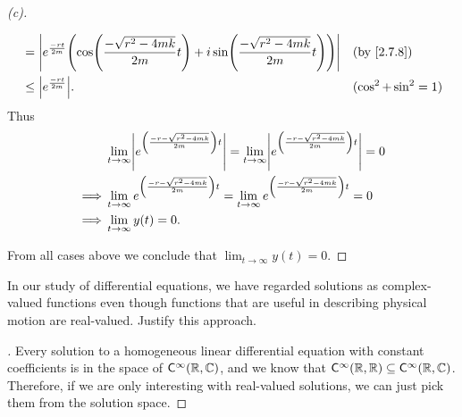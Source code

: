 \begin{proof}[(c)]
\begin{itemize}
\begin{align*}
			       & = \abs{e^{\frac{-rt}{2m}} \pa{\cos\pa{\frac{-\sqrt{r^2 - 4mk}}{2m} t} + i \sin\pa{\frac{-\sqrt{r^2 - 4mk}}{2m} t}}} &  & \by{2.7.8}            \\
			       & \leq \abs{e^{\frac{-rt}{2m}}}.                                                                                      &  & (\cos^2 + \sin^2 = 1)
		      \end{align*}
		      Thus
		      \begin{align*}
			               & \lim_{t \to \infty} \abs{e^{\pa{\frac{-r - \sqrt{r^2 - 4mk}}{2m}} t}} = \lim_{t \to \infty} \abs{e^{\pa{\frac{-r - \sqrt{r^2 - 4mk}}{2m}} t}} = 0 \\
			      \implies & \lim_{t \to \infty} e^{\pa{\frac{-r - \sqrt{r^2 - 4mk}}{2m}} t} = \lim_{t \to \infty} e^{\pa{\frac{-r - \sqrt{r^2 - 4mk}}{2m}} t} = 0             \\
			      \implies & \lim_{t \to \infty} y(t) = 0.
		      \end{align*}
	\end{itemize}
	From all cases above we conclude that \(\lim_{t \to \infty} y(t) = 0\).
\end{proof}

\begin{ex}\label{ex:2.7.19}
	In our study of differential equations, we have regarded solutions as complex-valued functions even though functions that are useful in describing physical motion are real-valued.
	Justify this approach.
\end{ex}

\begin{proof}[]
	Every solution to a homogeneous linear differential equation with constant coefficients is in the space of \(\cfs[\infty](\R, \C)\), and we know that \(\cfs[\infty](\R, \R) \subseteq \cfs[\infty](\R, \C)\).
	Therefore, if we are only interesting with real-valued solutions, we can just pick them from the solution space.
\end{proof}
